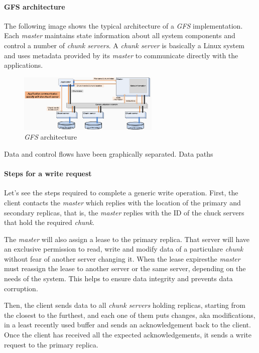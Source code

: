 \paragraph{GFS architecture}
The following image shows the typical architecture of a \emph{GFS} implementation.
Each \emph{master} maintains state information about all system components and
control a number of \emph{chunk servers}. A \emph{chunk server} is basically a
Linux system and uses metadata provided by its \emph{master} to communicate
directly with the applications.

\begin{figure}[ht!]
    \centering
    \includegraphics[width=0.6\textwidth]{images/gfs-architecture.png}
    \caption{\emph{GFS} architecture}
\end{figure}

\begin{note}
    Data and control flows have been graphically separated. Data paths
\end{note}

\paragraph{Steps for a write request}
Let's see the steps required to complete a generic write operation.
First, the client contacts the \emph{master} which replies with the location
of the primary and secondary replicas, that is, the \emph{master} replies with
the ID of the chuck servers that hold the required \emph{chunk}.

The \emph{master} will also assign a lease to the primary replica. That
server will have an exclusive permission to read, write and modify data of a
particulare \emph{chunk} without fear of another server changing it. When the
lease expires\footnotemark the \emph{master} must reassign the lease to another
server or the same server, depending on the needs of the system. This helps to
ensure data integrity and prevents data corruption.


Then, the client sends data to all \emph{chunk servers} holding replicas, starting
from the closest to the furthest, and each one of them puts changes, aka
modifications, in a least recently used buffer and sends an acknowledgement back
to the client. Once the client has received all the expected acknowledgements,
it sends a write request to the primary replica.


